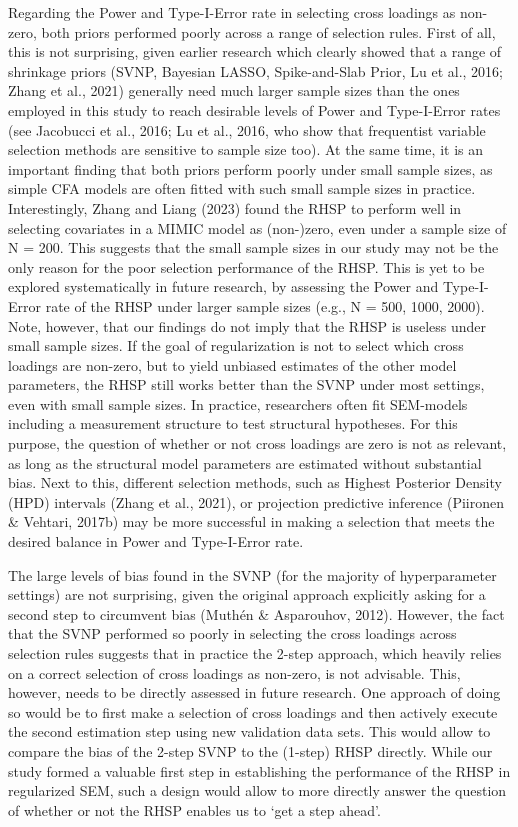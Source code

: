 \documentclass[
  man, donotrepeattitle,floatsintext]{apa6}
\begin{document}
Regarding the Power and Type-I-Error rate in selecting cross loadings as
non-zero, both priors performed poorly across a range of selection
rules. First of all, this is not surprising, given earlier research
which clearly showed that a range of shrinkage priors (SVNP, Bayesian
LASSO, Spike-and-Slab Prior, Lu et al., 2016; Zhang et al., 2021)
generally need much larger sample sizes than the ones employed in this
study to reach desirable levels of Power and Type-I-Error rates (see Jacobucci et al., 2016; Lu et al., 2016, who show that
frequentist variable selection methods are sensitive to sample size
too). At the same time, it is an important finding that both priors
perform poorly under small sample sizes, as simple CFA models are often
fitted with such small sample sizes in practice. Interestingly,
Zhang and Liang (2023) found the RHSP to perform well in selecting
covariates in a MIMIC model as (non-)zero, even under a sample size of N
= 200. This suggests that the small sample sizes in our study may not be
the only reason for the poor selection performance of the RHSP. This is
yet to be explored systematically in future research, by assessing the
Power and Type-I-Error rate of the RHSP under larger sample sizes (e.g.,
N = 500, 1000, 2000). Note, however, that our findings do not imply that
the RHSP is useless under small sample sizes. If the goal of
regularization is not to select which cross loadings are non-zero, but
to yield unbiased estimates of the other model parameters, the RHSP
still works better than the SVNP under most settings, even with small
sample sizes. In practice, researchers often fit SEM-models including a
measurement structure to test structural hypotheses. For this purpose,
the question of whether or not cross loadings are zero is not as
relevant, as long as the structural model parameters are estimated
without substantial bias. Next to this, different selection methods,
such as Highest Posterior Density (HPD) intervals
(Zhang et al., 2021), or projection predictive inference
(Piironen \& Vehtari, 2017b) may be more successful in making a selection
that meets the desired balance in Power and Type-I-Error rate.

The large levels of bias found in the SVNP (for the majority of
hyperparameter settings) are not surprising, given the original approach
explicitly asking for a second step to circumvent bias
(Muthén \& Asparouhov, 2012). However, the fact that the SVNP performed so
poorly in selecting the cross loadings across selection rules suggests
that in practice the 2-step approach, which heavily relies on a correct
selection of cross loadings as non-zero, is not advisable. This,
however, needs to be directly assessed in future research. One approach
of doing so would be to first make a selection of cross loadings and
then actively execute the second estimation step using new validation
data sets. This would allow to compare the bias of the 2-step SVNP to
the (1-step) RHSP directly. While our study formed a valuable first step
in establishing the performance of the RHSP in regularized SEM, such a
design would allow to more directly answer the question of whether or
not the RHSP enables us to `get a step ahead'.
\end{document}
